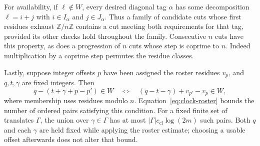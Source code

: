 For availability, if $\ell\notin W$, every desired diagonal tag
$\alpha$ has some decomposition $\ell=i+j$ with
$i\in I_\alpha$ and $j\in J_\alpha$.  Thus a family of candidate cuts
whose first residues exhaust $\mathbb Z/n\mathbb Z$ contains a cut
meeting both requirements for that tag, provided its other checks
hold throughout the family.  Consecutive $n$ cuts have this property,
as does a progression of $n$ cuts whose step is coprime to $n$.
Indeed multiplication by a coprime step permutes the residue classes.

Lastly, suppose integer offsets $p$ have been assigned the roster
residues $v_p$, and $q,t,\gamma$ are fixed integers.  Then
\[
 q-(t+\gamma+p-p')\in W
 \quad\Longleftrightarrow\quad
 (q-t-\gamma)+v_{p'}-v_p\in W,
\]
where membership uses residues modulo $n$.  Equation~\eqref{eq:clock-roster}
bounds the number of ordered pairs satisfying this condition.
For a fixed finite set of translates $\Gamma$, the union over
$\gamma\in\Gamma$ has at most
$|\Gamma|c_{\mathrm{cl}}\log(2m)$ such pairs.  Both $q$ and each
$\gamma$ are held fixed while applying the roster estimate; choosing
a usable offset afterwards does not alter that bound.
